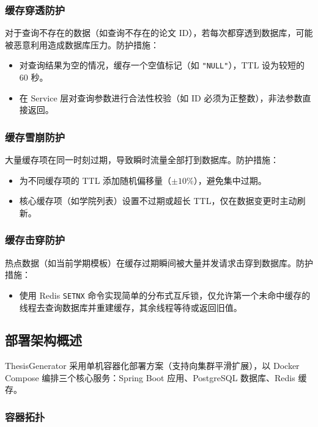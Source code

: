 \documentclass{../softeng}
\begin{document}
\subsubsection{缓存穿透防护}

对于查询不存在的数据（如查询不存在的论文 ID），若每次都穿透到数据库，可能被恶意利用造成数据库压力。防护措施：
\begin{itemize}
    \item 对查询结果为空的情况，缓存一个空值标记（如 \texttt{"NULL"}），TTL 设为较短的 60 秒。
    \item 在 Service 层对查询参数进行合法性校验（如 ID 必须为正整数），非法参数直接返回。
\end{itemize}

\subsubsection{缓存雪崩防护}

大量缓存项在同一时刻过期，导致瞬时流量全部打到数据库。防护措施：
\begin{itemize}
    \item 为不同缓存项的 TTL 添加随机偏移量（$\pm 10\%$），避免集中过期。
    \item 核心缓存项（如学院列表）设置不过期或超长 TTL，仅在数据变更时主动刷新。
\end{itemize}

\subsubsection{缓存击穿防护}

热点数据（如当前学期模板）在缓存过期瞬间被大量并发请求击穿到数据库。防护措施：
\begin{itemize}
    \item 使用 Redis \texttt{SETNX} 命令实现简单的分布式互斥锁，仅允许第一个未命中缓存的线程去查询数据库并重建缓存，其余线程等待或返回旧值。
\end{itemize}

\subsection{部署架构概述}

ThesisGenerator 采用单机容器化部署方案（支持向集群平滑扩展），以 Docker Compose 编排三个核心服务：Spring Boot 应用、PostgreSQL 数据库、Redis 缓存。

\subsubsection{容器拓扑}
\end{document}
